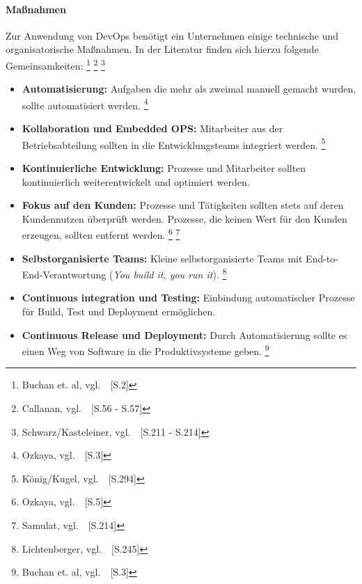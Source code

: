 \newpage
\paragraph{Maßnahmen}\label{devops_massnahmen}

Zur Anwendung von DevOps benötigt ein Unternehmen einige technische und organisatorische Maßnahmen.
In der Literatur finden sich hierzu folgende Gemeinsamkeiten:
\footnote{Buchan et. al, vgl.~\cite{Senapathi2018}~[S.2]}
\footnote{Callanan, vgl.~\cite{Callanan2016}~[S.56 - S.57]}
\footnote{Schwarz/Kasteleiner, vgl.~\cite{Kasteleiner2019}~[S.211 - S.214]}

\begin{itemize}
    \item \textbf{Automatisierung:}
    Aufgaben die mehr als zweimal manuell gemacht wurden, sollte automatisiert werden. \footnote{Ozkaya, vgl.~\cite{Ozkaya2019}~[S.3]}

    \item \textbf{Kollaboration und Embedded OPS:}
    Mitarbeiter aus der Betriebsabteilung sollten in die Entwicklungsteams integriert werden.  \footnote{König/Kugel, vgl.~\cite{Konig2019}~[S.294]}

    \item \textbf{Kontinuierliche Entwicklung:}
    Prozesse und Mitarbeiter sollten kontinuierlich weiterentwickelt und optimiert werden.

    \item \textbf{Fokus auf den Kunden:}
    Prozesse und Tätigkeiten sollten stets auf deren Kundennutzen überprüft werden.
    Prozesse, die keinen Wert für den Kunden erzeugen, sollten entfernt werden. \footnote{Ozkaya, vgl.~\cite{Ozkaya2019}~[S.5]} \footnote{Samulat, vgl.~\cite{Samulat2017}~[S.214]}

    \item \textbf{Selbstorganisierte Teams:}
    Kleine selbstorganisierte Teams mit End-to-End-Verantwortung (\textsl{You build it, you run it}). \footnote{Lichtenberger, vgl.~\cite{Lichtenberger2017}~[S.245]}

    \item \textbf{Continuous integration und Testing:}
    Einbindung automatischer Prozesse für Build, Test und Deployment ermöglichen.

    \item \textbf{Continuous Release und Deployment:}
    Durch Automatisierung sollte es einen Weg von Software in die Produktivsysteme geben. \footnote{Buchan et. al, vgl.~\cite{Senapathi2018}~[S.3]}


\end{itemize}
